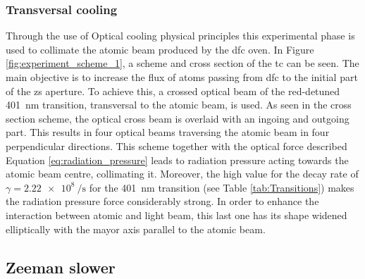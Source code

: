 \subsubsection{Transversal cooling}

Through the use of Optical cooling physical principles this experimental phase is used to collimate the atomic beam produced by the \ac{dfc} oven. In Figure \ref{fig:experiment_scheme_1}, a scheme and cross section of the \ac{tc} can be seen. The main objective is to increase the flux of atoms passing from \ac{dfc} to the initial part of the \ac{zs} aperture. To achieve this, a crossed optical beam of the red-detuned \SI{401}{\nano\meter} transition, transversal to the atomic beam, is used. As seen in the cross section scheme, the optical cross beam is overlaid with an ingoing and outgoing part. This results in four optical beams traversing the atomic beam in four perpendicular directions. This scheme together with the optical force described Equation \ref{eq:radiation_pressure} leads to radiation pressure acting towards the atomic beam centre, collimating it. Moreover, the high value for the decay rate of $\gamma = \SI{2.22e8}{\per\second}$ for the \SI{401}{\nano\meter} transition (see Table \ref{tab:Transitions}) makes the radiation pressure force considerably strong. In order to enhance the interaction between atomic and light beam, this last one has its shape widened elliptically with the mayor axis parallel to the atomic beam.


\subsection{Zeeman slower}

